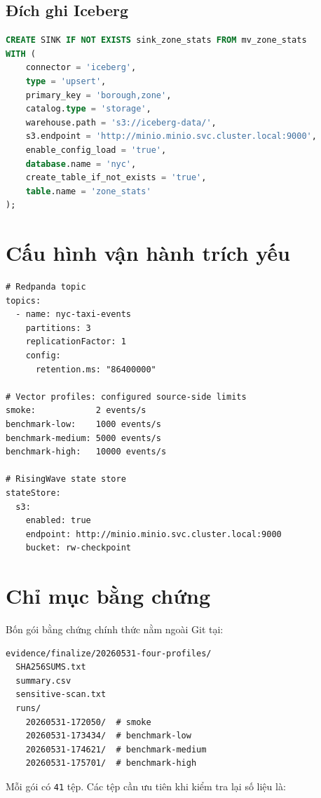\subsection{Đích ghi Iceberg}
\begin{lstlisting}[language=SQL]
CREATE SINK IF NOT EXISTS sink_zone_stats FROM mv_zone_stats
WITH (
    connector = 'iceberg',
    type = 'upsert',
    primary_key = 'borough,zone',
    catalog.type = 'storage',
    warehouse.path = 's3://iceberg-data/',
    s3.endpoint = 'http://minio.minio.svc.cluster.local:9000',
    enable_config_load = 'true',
    database.name = 'nyc',
    create_table_if_not_exists = 'true',
    table.name = 'zone_stats'
);
\end{lstlisting}

\section{Cấu hình vận hành trích yếu}\label{app:config}
\begin{lstlisting}
# Redpanda topic
topics:
  - name: nyc-taxi-events
    partitions: 3
    replicationFactor: 1
    config:
      retention.ms: "86400000"

# Vector profiles: configured source-side limits
smoke:            2 events/s
benchmark-low:    1000 events/s
benchmark-medium: 5000 events/s
benchmark-high:   10000 events/s

# RisingWave state store
stateStore:
  s3:
    enabled: true
    endpoint: http://minio.minio.svc.cluster.local:9000
    bucket: rw-checkpoint
\end{lstlisting}

\section{Chỉ mục bằng chứng}\label{app:evidence}
Bốn gói bằng chứng chính thức nằm ngoài Git tại:

\begin{lstlisting}
evidence/finalize/20260531-four-profiles/
  SHA256SUMS.txt
  summary.csv
  sensitive-scan.txt
  runs/
    20260531-172050/  # smoke
    20260531-173434/  # benchmark-low
    20260531-174621/  # benchmark-medium
    20260531-175701/  # benchmark-high
\end{lstlisting}

Mỗi gói có \texttt{41} tệp. Các tệp cần ưu tiên khi kiểm tra lại số liệu là:


